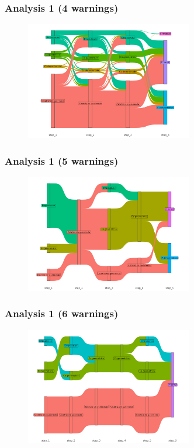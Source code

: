 \documentclass[aspectratio=169]{beamer}
\begin{document}
\begin{frame}
    \frametitle{Analysis 1 (4 warnings) }
    \begin{figure}[h] 
    \includegraphics[width=0.65\textwidth]{./figures/an1_plot_deter_prodes_subarea_trajectory_4.png}
    \end{figure}
\end{frame}

\begin{frame}
    \frametitle{Analysis 1 (5 warnings) }
    \begin{figure}[h] 
    \includegraphics[width=0.65\textwidth]{./figures/an1_plot_deter_prodes_subarea_trajectory_5.png}
    \end{figure}
\end{frame}

\begin{frame}
    \frametitle{Analysis 1 (6 warnings) }
    \begin{figure}[h] 
    \includegraphics[width=0.65\textwidth]{./figures/an1_plot_deter_prodes_subarea_trajectory_6.png}
    \end{figure}
\end{frame}
\end{document}
